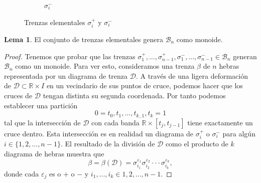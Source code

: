 \documentclass[12pt]{book}
\theoremstyle{definition}
\newtheorem{lema}{Lema}[section]
\begin{document}
\begin{figure}[h!]
\begin{subfigure}[b]{0.6\linewidth}
\begin{center}

\caption*{$\sigma_i^-$}
\end{center}
\end{subfigure} 


\caption{Trenzas elementales $\sigma_i^+$ y $\sigma_i^-$}
\label{fig:elem_braids}
\end{figure}


\begin{lema}
El conjunto de trenzas elementales genera $\mathcal{B}_n$ como monoide.
\label{lema:mono_tren}
\end{lema}

\begin{proof}
Tenemos que probar que las trenzas $\sigma_1^+,...,\sigma_{n-1}^+, \sigma_1^-,...,\sigma_{n-1}^-\in\mathcal{B}_n$ generan $\mathcal{B}_n$ como un monoide. Para ver esto, consideramos una trenza $\beta$ de $n$ hebras representada por un diagrama de trenza $\mathcal{D}$. A través de una ligera deformación de $\mathcal{D}\subset\mathbb{R}\times I$ en un vecindario de sus puntos de cruce, podemos hacer que los cruces de $\mathcal{D}$ tengan distinta su segunda coordenada. Por tanto podemos establecer una partición
$$0=t_0,t_1,...,t_{k_-1},t_k = 1$$
tal que la intersección de $\mathcal{D}$ con cada banda $\mathbb{R}\times[t_j, t_{j-1}]$ tiene exactamente un cruce dentro. Esta intersección es en realidad un diagrama de $\sigma_i^+$ o $\sigma_i^-$ para algún $i \in\{ 1,2,...,n-1\}$. El resultado de la división de $\mathcal{D}$ como el producto de $k$ diagrama de hebras muestra que
$$\beta = \beta(\mathcal{D}) = \sigma_{i_1}^{\varepsilon_1}\sigma_{i_2}^{\varepsilon_2}\cdot\cdot\cdot\sigma_{i_k}^{\varepsilon_k},$$
donde cada $\varepsilon_j$ es o $+$ o $-$ y $i_1,...,i_k\in{1,2,...,n-1}$.

\end{proof}
\end{document}

